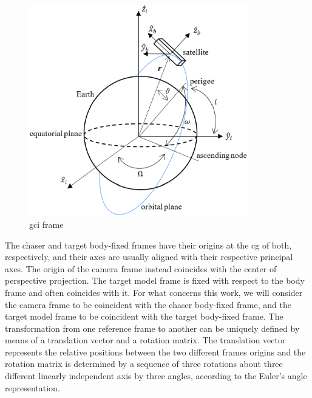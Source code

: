 \begin{figure}[htbp]
  \centering
  \includegraphics[width=0.85\textwidth]{gfx/gci.eps}
  \caption{\acrfull{gci} frame}
  \label{fig:raytracing}
\end{figure}

The chaser and target body-fixed frames have their origins at the \acrshort{cg} of both, respectively, and their axes are usually aligned with their respective principal axes.
The origin of the camera frame instead coincides with the center of perspective projection.
The target model frame is fixed with respect to the body frame and often coincides with it.
For what concerns this work, we will consider the camera frame to be coincident with the chaser body-fixed frame, and the target model frame to be coincident with the target body-fixed frame.
The transformation from one reference frame to another can be uniquely defined by means of a translation vector and a rotation matrix. The translation vector represents the relative positions between the two different frames origins and the rotation matrix is determined by a sequence of three rotations about three different linearly independent axis by three angles, according to the Euler's angle representation.

